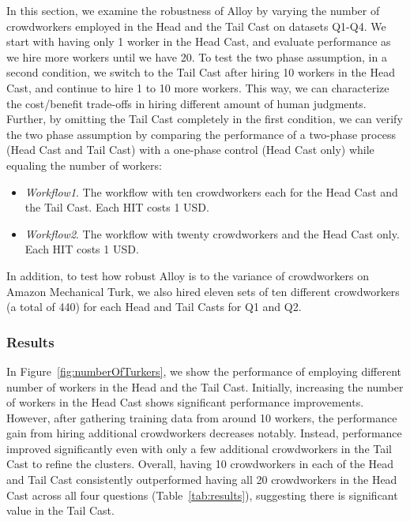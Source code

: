 



In this section, we examine the robustness of
Alloy by varying the number of crowdworkers employed in the Head and the Tail Cast on datasets Q1-Q4. We start
with having only 1 worker in the Head Cast, and evaluate performance as we hire more
workers until we have 20. To test the two phase assumption, in a second
condition, we switch to the Tail Cast after hiring 10 workers in the Head Cast,
and continue to hire 1 to 10 more workers.
This way, we can characterize the cost/benefit trade-offs in hiring different amount of human
judgments. Further, by omitting the Tail Cast completely 
in the first condition, we can verify
the two phase assumption by comparing the performance of a two-phase process
(Head Cast and Tail Cast) with a one-phase control (Head Cast only) while equaling
the number of workers:

\begin{itemize}
    \setlength\itemsep{0.0em}
	\item \emph{Workflow1}. The workflow with ten crowdworkers each for
		the Head Cast and the Tail Cast. Each HIT costs 1 USD.
	\item \emph{Workflow2}. The workflow with twenty crowdworkers and
		the Head Cast only. Each HIT costs 1 USD.
\end{itemize}

In addition, to test how robust Alloy is to the variance of crowdworkers on Amazon Mechanical Turk, 
we also hired eleven sets of ten different crowdworkers (a total of 440) for each 
Head and Tail Casts for Q1 and Q2. 

\subsubsection*{Results}


In Figure~\ref{fig:numberOfTurkers}, we show the performance of
employing different number of workers in the Head and the Tail Cast.  Initially,
increasing the number of workers in the Head Cast shows significant
performance improvements.  However, after gathering training data from around 10 
workers, the performance gain from hiring additional
crowdworkers decreases notably. Instead, performance improved significantly
even with only a few additional crowdworkers in the Tail Cast to refine
the clusters. Overall, 
having
10 crowdworkers in each of the Head and Tail Cast consistently outperformed having all
20 crowdworkers in the Head Cast across all four questions (Table~\ref{tab:results}),
suggesting there is significant value in the Tail Cast.

